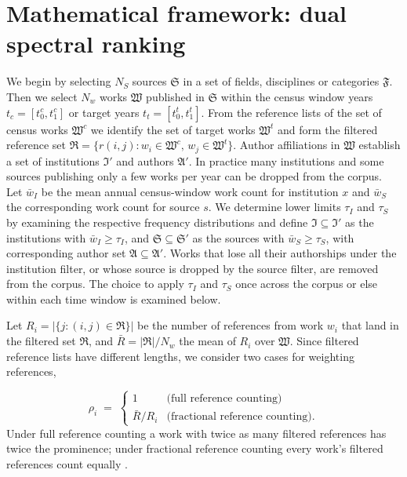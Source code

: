 \section{Mathematical framework: dual spectral ranking}
\label{sec:networks}

We begin by selecting $N_S$ sources $\mathfrak{S}$ in a set of fields, disciplines or categories $\mathfrak{F}$.
Then we select $N_w$ works $\mathfrak{W}$ published in $\mathfrak{S}$ within the census
window years $t_c = [t^c_0, t^c_1]$ or target years $t_t = [t^t_0, t^t_1]$.
From the reference lists of the set of census works $\mathfrak{W}^c$ we identify the set
of target works $\mathfrak{W}^t$ and form the filtered reference set
$\mathfrak{R}=\{r(i,j):w_i\in\mathfrak{W}^c,\,w_j\in\mathfrak{W}^t\}$.
Author affiliations in $\mathfrak{W}$ establish a set of institutions $\mathfrak{I}'$ and
authors $\mathfrak{A}'$. In practice many institutions and some sources publishing only
a few works per year can be dropped from the corpus. Let $\bar{w}_I$ be the mean annual
census-window work count for institution $x$ and $\bar{w}_S$ the corresponding work count for source $s$.
We determine lower limits $\tau_I$ and $\tau_S$ by examining the respective frequency distributions and define
$\mathfrak{I}\subseteq\mathfrak{I}'$ as the institutions with $\bar{w}_I\geq\tau_I$,
and $\mathfrak{S}\subseteq\mathfrak{S}'$ as the sources with $\bar{w}_S\geq\tau_S$,
with corresponding author set $\mathfrak{A}\subseteq\mathfrak{A}'$.
Works that lose all their authorships under the institution filter, or whose source is
dropped by the source filter, are removed from the corpus. The choice to apply $\tau_I$ and $\tau_S$ once across
the corpus or else within each time window is examined below.

Let $R_i=|\{j:(i, j)\in\mathfrak{R}\}|$ be the number of references from work
$w_i$ that land in the filtered set $\mathfrak{R}$, and
$\bar{R}=|\mathfrak{R}|/N_w$ the mean of $R_i$ over $\mathfrak{W}$. Since filtered reference lists
have different lengths, we consider two cases for weighting references,

\begin{equation}
	\rho_i \;=\;
	\begin{cases}
		 1 & \text{(full reference counting)} \\
		\bar{R}/R_i & \text{(fractional reference counting).}
	\end{cases}
	\label{eq:rho}
\end{equation}
Under full reference counting a work with twice as many filtered references has twice
the prominence; under fractional reference counting every work's filtered references count
equally \citep{zittModifyingJournalImpact2008}.

